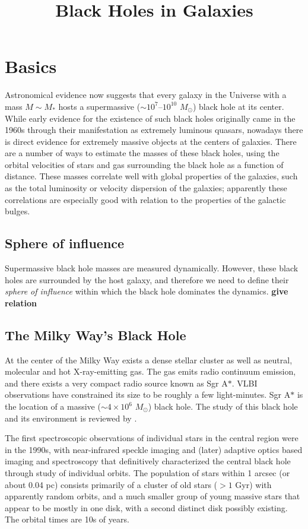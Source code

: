 \title{Black Holes in Galaxies}

\section{Basics}

Astronomical evidence now suggests that every galaxy in the Universe
with a mass $M\sim M_\ast$ hosts a supermassive ($\sim
10^7$--$10^{10}$ $M_\odot$) black hole at its center. While early
evidence for the existence of such black holes originally came in the
1960s through their manifestation as extremely luminous quasars,
nowadays there is direct evidence for extremely massive objects at the
centers of galaxies.  There are a number of ways to estimate the
masses of these black holes, using the orbital velocities of stars and
gas surrounding the black hole as a function of distance. These masses
correlate well with global properties of the galaxies, such as the
total luminosity or velocity dispersion of the galaxies; apparently
these correlations are especially good with relation to the properties
of the galactic bulges.

\subsection{Sphere of influence}

Supermassive black hole masses are measured dynamically. However,
these black holes are surrounded by the host galaxy, and therefore we
need to define their {\it sphere of influence} within which the black
hole dominates the dynamics. {\bf give relation}

\subsection{The Milky Way's Black Hole}

At the center of the Milky Way exists a dense stellar cluster as well
as neutral, molecular and hot X-ray-emitting gas. The gas emits radio
continuum emission, and there exists a very compact radio source known
as Sgr A$\ast$. VLBI observations have constrained its size to be
roughly a few light-minutes.  Sgr A$\ast$ is the location of a massive
($\sim 4\times 10^6$ $M_\odot$) black hole.  The study of this black
hole and its environment is reviewed by \citet{genzel10a}.

The first spectroscopic observations of individual stars in the
central region were in the 1990s, with near-infrared speckle imaging
and (later) adaptive optics based imaging and spectroscopy that
definitively characterized the central black hole through study of
individual orbits.  The population of stars within 1 arcsec (or about
0.04 pc) consists primarily of a cluster of old stars ($>1$ Gyr) with
apparently random orbits, and a much smaller group of young massive
stars that appear to be mostly in one disk, with a second distinct
disk possibly existing. The orbital times are 10s of years.

